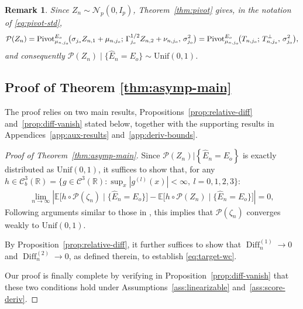 \documentclass[12pt]{article}
\newcommand{\RD}{\operatorname{Diff}}
\newcommand{\Pivot}{\text{\normalfont Pivot}}
\newtheorem{remark}{Remark}
\newcommand{\real}{\mathbb{R}}
\newcommand{\Ee}{{\mathbb{E}}}
\newcommand{\cP}{{\mathcal{P}}}
\begin{document}
\begin{appendices}
\begin{remark}\label{rem:gaussian:comp}
Since $Z_n\sim\mathcal N_p(0,I_p)$, Theorem~\ref{thm:pivot} gives, in the notation of \eqref{eq:pivot-std},
\begin{align*}
\cP(Z_n)
=\Pivot^{E_o}_{\mu_{n,j_o}}\!\big(\sigma_{j_o}Z_{n,1}+\mu_{n,j_o};\,\Gamma_{j_o}^{1/2}Z_{n,2}+\nu_{n,j_o},\,\sigma_{j_o}^2\big)
=\Pivot^{E_o}_{\mu_{n,j_o}}\!\big(T_{n,j_o};\,T_{n,j_o}^\perp,\,\sigma_{j_o}^2\big),
\end{align*}
and consequently $\cP(Z_n)\mid\{\widehat E_n=E_o\}\sim\mathrm{Unif}(0,1)$.
\end{remark}


\subsection{Proof of Theorem \ref{thm:asymp-main}}
 The proof relies on two main results, Propositions~\ref{prop:relative-diff} and~\ref{prop:diff-vanish} stated below, together with the supporting results in Appendices~\ref{app:aux-results} and~\ref{app:deriv-bounds}.


\begin{proof}[Proof of Theorem~\ref{thm:asymp-main}]
Since $\cP(Z_n)\Big\lvert \left\{\widehat E_n=E_o\right\}$ is exactly distributed as $\mathrm{Unif}(0,1)$, it suffices to show that, for any $h\in\mathcal C^3_b(\real)=\{g\in\mathcal C^3(\real): \sup_x|g^{(l)}(x)|<\infty,\ l=0,1,2,3\}$: 
\begin{align}
  \label{eq:target-wc}
  \lim_{n\to\infty}
  \left|
    \Ee\big[h\circ\cP(\zeta_n)\mid\{\widehat E_n=E_o\}\big]
    -\Ee\big[h\circ\cP(Z_n)\mid\{\widehat E_n=E_o\}\big]
  \right|=0,
\end{align}
Following arguments similar to those in \cite{randomizedresponse, bakshi2024selective}, this implies that $\cP(\zeta_n)$ converges weakly to $\mathrm{Unif}(0,1)$.

By Proposition~\ref{prop:relative-diff}, it further suffices to show that $\RD_n^{(1)}\to 0$ and $\RD_n^{(2)}\to0$, as defined therein, to establish \eqref{eq:target-wc}.

Our proof is finally complete by verifying in Proposition~\ref{prop:diff-vanish} that these two conditions hold under Assumptions~\ref{ass:linearizable} and~\ref{ass:score-deriv}.
\end{proof}



\end{appendices}
\end{document}
